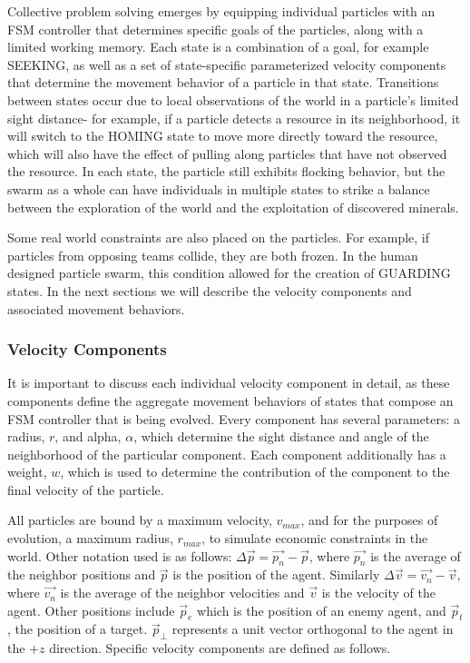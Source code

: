 \documentclass[conference,final]{IEEEtran}
\begin{document}
Collective problem solving emerges by equipping individual particles with an FSM controller that determines specific goals of the particles, along with a limited working memory. Each state is a combination of a goal, for example SEEKING, as well as a set of state-specific parameterized velocity components that determine the movement behavior of a particle in that state. Transitions between states occur due to local observations of the world in a particle's limited sight distance- for example, if a particle detects a resource in its neighborhood, it will switch to the HOMING state to move more directly toward the resource, which will also have the effect of pulling along particles that have not observed the resource. In each state, the particle still exhibits flocking behavior, but the swarm as a whole can have individuals in multiple states to strike a balance between the exploration of the world and the exploitation of discovered minerals.

Some real world constraints are also placed on the particles. For example, if particles from opposing teams collide, they are both frozen. In the human designed particle swarm, this condition allowed for the creation of GUARDING states. In the next sections we will describe the velocity components and associated movement behaviors.

\subsubsection{Velocity Components}

It is important to discuss each individual velocity component in detail, as these components define the aggregate movement behaviors of states that compose an FSM controller that is being evolved. Every component has several parameters: a radius, $r$, and alpha, $\alpha$, which determine the sight distance and angle of the neighborhood of the particular component. Each component additionally has a weight, $w$, which is used to determine the contribution of the component to the final velocity of the particle.

All particles are bound by a maximum velocity, $v_{max}$, and for the purposes of evolution, a maximum radius, $r_{max}$, to simulate economic constraints in the world. Other notation used is as follows: $\Delta \vec {p} = \vec {p_n} - \vec {p}$, where $\vec {p_n}$ is the average of the neighbor positions and $\vec p$ is the position of the agent. Similarly $\Delta \vec {v} = \vec {v_n} - \vec v$, where $\vec {v_n}$ is the average of the neighbor velocities and $\vec v$ is the velocity of the agent. Other positions include $\vec p_e$ which is the position of an enemy agent, and $\vec p_t$, the position of a target. $\vec p_\perp$ represents a unit vector orthogonal to the agent in the $+z$ direction. Specific velocity components are defined as follows.
\end{document}
